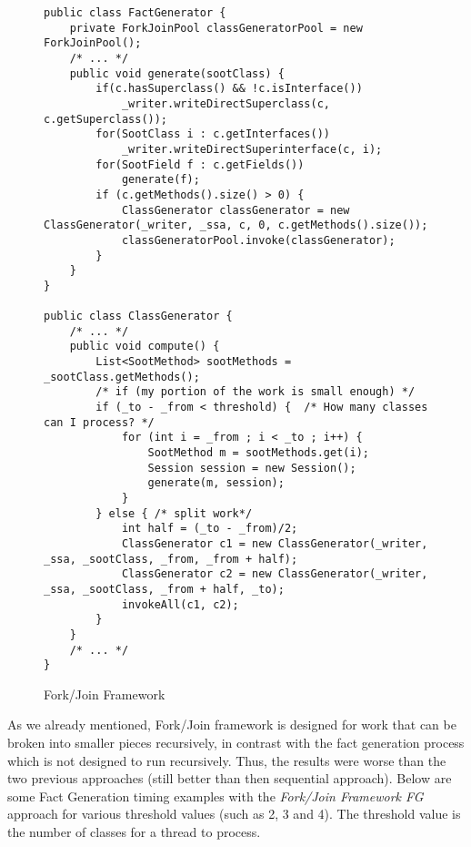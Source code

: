 \documentclass{dithesis}
\begin{document}
        \begin{figure}[H]
\begin{lstlisting}
public class FactGenerator {
    private ForkJoinPool classGeneratorPool = new ForkJoinPool();
    /* ... */
    public void generate(sootClass) {
        if(c.hasSuperclass() && !c.isInterface())
            _writer.writeDirectSuperclass(c, c.getSuperclass());
        for(SootClass i : c.getInterfaces())
            _writer.writeDirectSuperinterface(c, i);
        for(SootField f : c.getFields())
            generate(f);
        if (c.getMethods().size() > 0) {
            ClassGenerator classGenerator = new ClassGenerator(_writer, _ssa, c, 0, c.getMethods().size());
            classGeneratorPool.invoke(classGenerator);
        }
    }
}

public class ClassGenerator {
    /* ... */
    public void compute() {
        List<SootMethod> sootMethods = _sootClass.getMethods();
        /* if (my portion of the work is small enough) */
        if (_to - _from < threshold) {  /* How many classes can I process? */
            for (int i = _from ; i < _to ; i++) {
                SootMethod m = sootMethods.get(i);
                Session session = new Session();
                generate(m, session);
            }
        } else { /* split work*/
            int half = (_to - _from)/2;
            ClassGenerator c1 = new ClassGenerator(_writer, _ssa, _sootClass, _from, _from + half);
            ClassGenerator c2 = new ClassGenerator(_writer, _ssa, _sootClass, _from + half, _to);
            invokeAll(c1, c2);
        }
    }
    /* ... */
}
\end{lstlisting}
        \caption{Fork/Join Framework}
        \end{figure}
        As we already mentioned, Fork/Join framework is designed for work that can be broken into smaller pieces recursively, in contrast with the fact generation process which is not designed to run recursively. Thus, the results were worse than the two previous approaches (still better than then sequential approach). Below are some Fact Generation timing examples with the \textit{Fork/Join Framework FG} approach for various threshold values (such as 2, 3 and 4). The threshold value is the number of classes for a thread to process.
\end{document}
